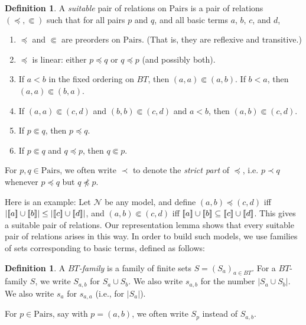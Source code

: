 \documentclass[letterpaper]{article} %
\theoremstyle{definition}
\newtheorem{definition}[theorem]{Definition}
\newcommand{\semantics}[1]{[\![\mbox{\em $ #1 $\/}]\!]}
\newcommand{\Nodel}{\mathcal{N}}
\newcommand{\quadiff}{\quad \mbox{ iff } \quad}
\newcommand{\Aunion}{\mathscr{A}^{\cup}}
\newcommand{\card}{\mathrm{card}}
\newcommand{\Pairs}{\mbox{Pairs}}
\newcommand{\precsubseteq}{\Subset}
\newcommand{\suitable}{suitable}%
\begin{document}
\begin{definition}
A \emph{\suitable}
pair of relations on $\Pairs$ 
is a pair of relations $(\preceq, \precsubseteq)$ such that for all pairs $p$ and $q$, and all basic terms $a$, $b$, $c$, and $d$,

\begin{enumerate}
\item $\preceq$ and $\precsubseteq$ are preorders on $\Pairs$.
(That is, they are reflexive and transitive.)
\item   $\preceq$ is linear:
 either $p \preceq q$ or $q \preceq p$ (and possibly both).
 \item If $a < b$ in the fixed ordering on $BT$, then $(a,a) \precsubseteq (a,b)$.  If $b < a$, then $(a,a) \precsubseteq (b,a)$. 
 \item If $(a,a) \precsubseteq (c,d)$ and $(b,b) \precsubseteq (c,d)$ and $a < b$,
 then $(a,b) \precsubseteq (c,d)$.
\item If $p \precsubseteq q$, then $p\preceq q$.
\item If $p \precsubseteq q$ and $q\preceq p$, then $q \precsubseteq p$.
\end{enumerate}


For $p,q \in \Pairs$, we often write $\prec$ to denote the \emph{strict part} of $\preceq$, i.e. $p \prec q$ whenever $p \preceq q$ but $q \not \preceq p$.
\label{def-suitable-pair-first}
\end{definition}

Here is an example:
Let $\Nodel$ be any model, and define $(a,b) \preceq (c,d)$ iff 
$|\semantics{a} \cup \semantics{b}| \leq
|\semantics{c} \cup \semantics{d}|$, and 
 $(a,b) \precsubseteq (c,d)$ iff 
$\semantics{a} \cup \semantics{b} \subseteq
\semantics{c} \cup \semantics{d}$.
This gives a {\suitable} pair of relations.
Our representation lemma shows that every {\suitable} pair of relations arises in
this way.  In order to build such models, we use families of sets corresponding to basic terms, defined as follows:

\begin{definition}
 A \emph{$BT$-family} is a family of finite sets
$S = (S_a)_{a\in BT}$.
For a $BT$-family $S$, we write $S_{a,b}$ for $S_a \cup S_b$.  We also write $s_{a,b}$
for the number  $|S_a\cup S_b|$.  
We also write $s_a$ for $s_{a,a}$ (i.e., for $|S_a|$).

For $p\in\Pairs$, say with $p= (a,b)$, we often write $S_p$ instead of $S_{a,b}$.
\end{definition}
\end{document}

